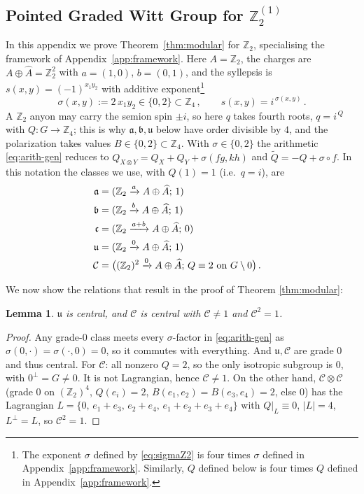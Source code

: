 \documentclass[aps,twocolumn,prx,floatfix,preprintnumbers, nofootinbib,10pt]{revtex4-2}
\numberwithin{equation}{section}
\newtheorem{lemma}[theorem]{Lemma}
\theoremstyle{definition}
\theoremstyle{remark}
\theoremstyle{claim}
\newcommand{\be}{\begin{equation}}
\newcommand{\ee}{\end{equation}}
\newcommand{\ba}{\begin{aligned}}
\newcommand{\ea}{\end{aligned}}
\newcommand{\ga}{\mathfrak{a}}
\newcommand{\gb}{\mathfrak{b}}
\newcommand{\gc}{\mathfrak{c}}
\newcommand{\gu}{\mathfrak{u}}
\newcommand{\Z}{{\mathbb Z}}
\newcommand{\cc}{\mathcal{C}}
\newcommand{\cC}{\mathcal{C}}
\begin{document}
\subsection{Pointed Graded Witt Group for $\Z_2^{(1)}$}
\label{app:WittZ2}


In this appendix we prove Theorem~\ref{thm:modular} for $\Z_2$, specialising the
framework of Appendix~\ref{app:framework}.  Here $A=\Z_2$, the charges are
$A\oplus\widehat A=\Z_2^2$ with $a=(1,0)$, $b=(0,1)$, and the syllepsis is
$s(x,y)=(-1)^{x_1y_2}$ with additive exponent\footnote{The exponent $\sigma$ defined by \eqref{eq:sigmaZ2} is four times $\sigma$ defined in Appendix~\ref{app:framework}. Similarly, $Q$ defined below is four times $Q$ defined in Appendix~\ref{app:framework}.}
\be
  \sigma(x,y):=2\,x_1y_2\in\{0,2\}\subset\Z_4\,,\qquad s(x,y)=i^{\,\sigma(x,y)}\,.
\label{eq:sigmaZ2}
\ee
A $\Z_2$ anyon may carry the semion spin $\pm i$, so here $q$ takes fourth roots,
$q=i^{\,Q}$ with $Q:G\to\Z_4$; this is why $\ga,\gb,\gu$ below have order divisible
by $4$, and the polarization takes values $B\in\{0,2\}\subset\Z_4$.  With
$\sigma\in\{0,2\}$ the arithmetic \eqref{eq:arith-gen} reduces to
$Q_{X\otimes Y}=Q_X+Q_Y+\sigma(f g,k h)$ and $\widetilde Q=-Q+\sigma\circ f$.  In
this notation the classes we use, with $Q(1)=1$ (i.e.\ $q=i$), are
\be\label{gens}
\ba
\ga&=(\Z_2\xrightarrow{a}A\oplus\widehat A;\,1)\cr
\gb&=(\Z_2\xrightarrow{b}A\oplus\widehat A;\,1)\cr
\gc&=(\Z_2\xrightarrow{a+b}A\oplus\widehat A;\,0) \cr
\gu&=(\Z_2\xrightarrow{0}A\oplus\widehat A;\,1)\cr
\cC&=\big((\Z_2)^2\xrightarrow{0}A\oplus\widehat A;\,Q\equiv2\text{ on }G\setminus0\big)\,.
\ea\ee

We now show the relations that result in the proof of Theorem \ref{thm:modular}: 
\begin{lemma}\label{lem:basic}
$\gu$ is central, and $\cc$ is central with $\cC\neq 1$ and $\cC^2=1$.
\end{lemma}
\begin{proof}
Any grade-$0$ class meets every $\sigma$-factor in \eqref{eq:arith-gen} as $\sigma(0,\cdot)=\sigma(\cdot,0)=0$,
so it commutes with everything. And $\gu,\cC$ are grade $0$ and thus central. For $\cC$: all nonzero $Q=2$, so the only
isotropic subgroup is $0$, with $0^\perp=G\neq0$. It is not  Lagrangian, hence $\cC\neq 1$. On the other hand, 
$\cC\otimes\cC$ (grade $0$ on $(\Z_2)^4$, $Q(e_i)=2$, $B(e_1,e_2)=B(e_3,e_4)=2$, else $0$) has the
Lagrangian $L=\{0,\,e_1{+}e_3,\,e_2{+}e_4,\,e_1{+}e_2{+}e_3{+}e_4\}$ with $Q|_L\equiv0$, $|L|=4$,
$L^\perp=L$, so $\cC^2=1$.
\end{proof}
\end{document}
